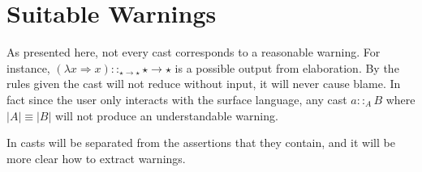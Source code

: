 \section{Suitable Warnings}
 
As presented here, not every cast corresponds to a reasonable warning.
For instance, $\left(\lambda x\Rightarrow x\right)::_{\star\rightarrow\star}\star\rightarrow\star$ is a possible output from elaboration.
By the rules given the cast will not reduce without input, it will never cause blame.
In fact since the user only interacts with the surface language, any cast $a::_{A}B$ where $|A|\equiv|B|$ will not produce an understandable warning.
 
 
 
In  casts will be separated from the assertions that they contain, and it will be more clear how to extract warnings.
